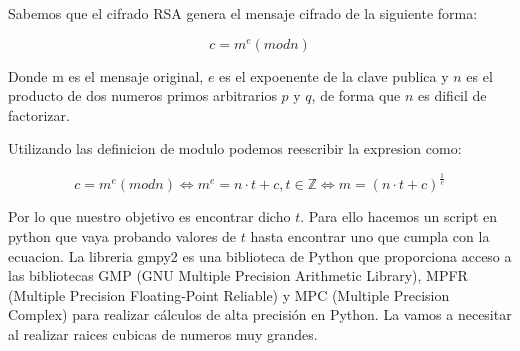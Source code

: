 Sabemos que el cifrado RSA genera el mensaje cifrado de la siguiente forma:

$$c=m^e (mod n)$$

Donde m es el mensaje original, $e$ es el expoenente de la clave publica y $n$ es el producto de dos numeros primos arbitrarios $p$ y $q$, de forma que $n$ es dificil de factorizar.

Utilizando las definicion de modulo podemos reescribir la expresion como:

$$c = m^e (mod n) \iff m^e = n\cdot t + c , t \in\mathbb{Z} \iff m = \left(n\cdot t + c\right)^{\frac{1}{e}}$$

Por lo que nuestro objetivo es encontrar dicho $t$. Para ello hacemos un script en python que vaya probando valores de $t$ hasta encontrar uno que cumpla con la ecuacion.
La libreria gmpy2 es una biblioteca de Python que proporciona acceso a las bibliotecas GMP (GNU Multiple Precision Arithmetic Library), MPFR (Multiple Precision Floating-Point Reliable) y MPC (Multiple Precision Complex) para realizar cálculos de alta precisión en Python.
La vamos a necesitar al realizar raices cubicas de numeros muy grandes.